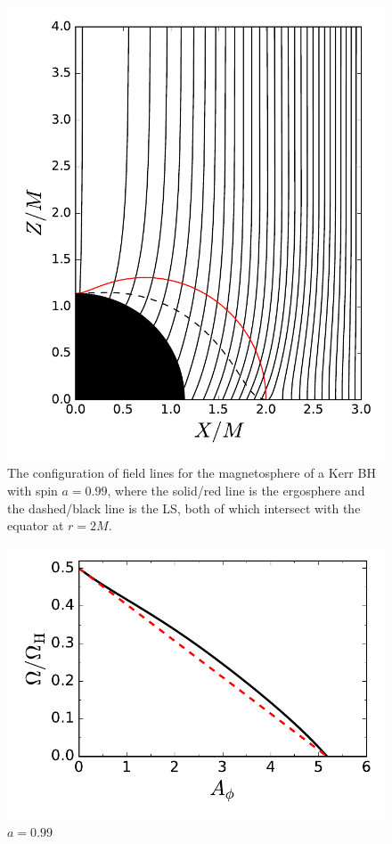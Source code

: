 \documentclass[aps,prd,reprint,nofootinbib, superscriptaddress]{revtex4-1}
\begin{document}
\begin{figure}
\includegraphics[scale=0.55]{f1}
\caption{\label{fig:field_lines} The configuration of field lines for the magnetosphere of a Kerr BH with spin $a=0.99$,
where the solid/red line is the ergosphere and the dashed/black line is the LS, both of which intersect with
the equator at $r=2 M$. }
\end{figure}

\begin{figure}
\includegraphics[scale=0.6]{f2}
\caption{\label{fig:omega} $a=0.99$}
\end{figure}



\end{document}
